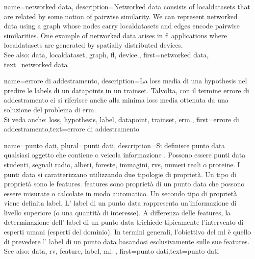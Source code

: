 {name={networked data},
	description={Networked \gls{data} consists of \glspl{localdataset} 
	that are related by some notion of pairwise similarity. We can represent networked 
	\gls{data} using a \gls{graph} whose nodes carry \glspl{localdataset} and edges encode 
	pairwise similarities. One example of networked \gls{data} arises in \gls{fl} applications 
	where \glspl{localdataset} are generated by spatially distributed \glspl{device}.
			\\
		See also: \gls{data}, \gls{localdataset}, \gls{graph}, \gls{fl}, \gls{device}.}, 
	first={networked data},
	text={networked data}  
}

{
	name={errore di addestramento},
	description={La \gls{loss} media di una \gls{hypothesis} nel 
		predire le \glspl{label} di un \glspl{datapoint} in un \gls{trainset}. 
		Talvolta, con il termine errore di addestramento ci si riferisce anche alla minima \gls{loss} 
		media ottenuta da una soluzione del problema di \gls{erm}.
				\\
		Si veda anche: \gls{loss}, \gls{hypothesis}, \gls{label}, \gls{datapoint}, \gls{trainset}, \gls{erm}.},
		first={errore di addestramento},text={errore di addestramento}  
}

{name={punto dati}, plural={punti dati},
description={Si definisce  punto \gls{data} qualsiasi oggetto che contiene o veicola informazione \cite{coverthomas}. Possono essere punti \gls{data}  
		studenti, segnali radio, alberi, foreste, immagini, \gls{rv}s, numeri reali o proteine. I punti \gls{data} si caratterizzano 
		utilizzando due tipologie di proprietà. Un tipo di proprietà sono le \glspl{feature}. \Glspl{feature} sono proprietà di un 
		punto \gls{data} che possono essere misurate o calcolate in modo automatico. 
		Un secondo tipo di proprietà viene definita \gls{label}. L' \gls{label} di 
		un punto \gls{data} rappresenta un'informazione di livello superiore (o una quantità di interesse). 
		A differenza delle \glspl{feature}, la determinazione dell’ \gls{label} di un punto \gls{data} trichiede tipicamente l’intervento di esperti umani (esperti del dominio). 
		In termini generali, l’obiettivo del \gls{ml} è quello di prevedere 
		l' \gls{label} di un punto \gls{data} basandosi esclusivamente sulle sue \glspl{feature}. 
				\\
		See also: \gls{data}, \gls{rv}, \gls{feature}, \gls{label}, \gls{ml}.
		}, first={punto dati},text={punto dati}  
}


